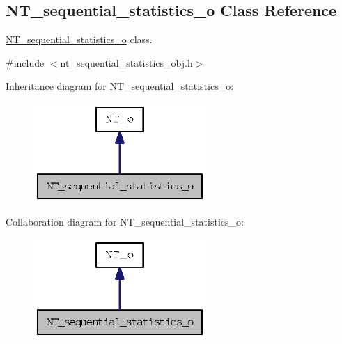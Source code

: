 \subsection{NT\_\-sequential\_\-statistics\_\-o Class Reference}
\label{class_n_t__sequential__statistics__o}


\hyperlink{class_n_t__sequential__statistics__o}{NT\_\-sequential\_\-statistics\_\-o} class.  




{\ttfamily \#include $<$nt\_\-sequential\_\-statistics\_\-obj.h$>$}



Inheritance diagram for NT\_\-sequential\_\-statistics\_\-o:
\nopagebreak
\begin{figure}[H]
\begin{center}
\leavevmode
\includegraphics[width=186pt]{class_n_t__sequential__statistics__o__inherit__graph}
\end{center}
\end{figure}


Collaboration diagram for NT\_\-sequential\_\-statistics\_\-o:
\nopagebreak
\begin{figure}[H]
\begin{center}
\leavevmode
\includegraphics[width=186pt]{class_n_t__sequential__statistics__o__coll__graph}
\end{center}
\end{figure}
